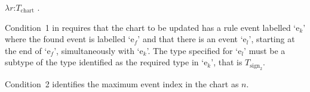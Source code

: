 \begin{ex}
$\lambda r$:$T_{\mathrm{chart}}$ . \\
\hspace*{1em} 
   
\end{ex} 
Condition~1 in \preveg{} requires that the chart to be updated has a
rule event labelled `e$_k$' where the found event is labelled `e$_f$'
and that there is an event `e$_l$', starting at the end of `e$_f$',
simultaneously with `e$_k$'.  The type specified for `e$_l$' must be a
subtype of the type identified as the required type in `e$_k$', that
is $T_{\mathrm{sign}_2}$.

Condition~2 identifies the maximum event index in the chart as $n$.

